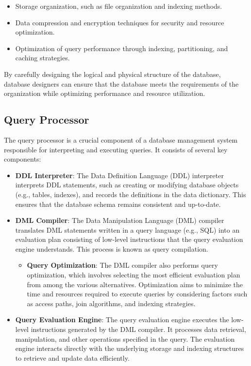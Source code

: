\documentclass{article}
\begin{document}
\begin{itemize}
    \item Storage organization, such as file organization and indexing methods.
    \item Data compression and encryption techniques for security and resource optimization.
    \item Optimization of query performance through indexing, partitioning, and caching strategies.
\end{itemize}

By carefully designing the logical and physical structure of the database, database designers can ensure that the database meets the requirements of the organization while optimizing performance and resource utilization.



\subsection*{Query Processor}

The query processor is a crucial component of a database management system responsible for interpreting and executing queries. It consists of several key components:

\begin{itemize}
    \item \textbf{DDL Interpreter}: The Data Definition Language (DDL) interpreter interprets DDL statements, such as creating or modifying database objects (e.g., tables, indexes), and records the definitions in the data dictionary. This ensures that the database schema remains consistent and up-to-date.
    
    \item \textbf{DML Compiler}: The Data Manipulation Language (DML) compiler translates DML statements written in a query language (e.g., SQL) into an evaluation plan consisting of low-level instructions that the query evaluation engine understands. This process is known as query compilation.
    
    \begin{itemize}
        \item \textbf{Query Optimization}: The DML compiler also performs query optimization, which involves selecting the most efficient evaluation plan from among the various alternatives. Optimization aims to minimize the time and resources required to execute queries by considering factors such as access paths, join algorithms, and indexing strategies.
    \end{itemize}
    
    \item \textbf{Query Evaluation Engine}: The query evaluation engine executes the low-level instructions generated by the DML compiler. It processes data retrieval, manipulation, and other operations specified in the query. The evaluation engine interacts directly with the underlying storage and indexing structures to retrieve and update data efficiently.
\end{itemize}
\end{document}
